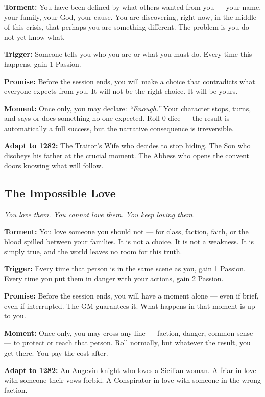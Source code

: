 \textbf{Torment:} You have been defined by what others wanted from you
--- your name, your family, your God, your cause. You are discovering,
right now, in the middle of this crisis, that perhaps you are something
different. The problem is you do not yet know what.

\textbf{Trigger:} Someone tells you who you are or what you must do.
Every time this happens, gain 1 Passion.

\textbf{Promise:} Before the session ends, you will make a choice that
contradicts what everyone expects from you. It will not be the right
choice. It will be yours.

\textbf{Moment:} Once only, you may declare: \textit{``Enough.''} Your
character stops, turns, and says or does something no one expected.
Roll 0 dice --- the result is automatically a full success, but the
narrative consequence is irreversible.

\textbf{Adapt to 1282:} The Traitor's Wife who decides to stop hiding.
The Son who disobeys his father at the crucial moment. The Abbess who
opens the convent doors knowing what will follow.

\filetto

\subsection{The Impossible Love}
\textit{You love them. You cannot love them. You keep loving them.}

\textbf{Torment:} You love someone you should not --- for class, faction,
faith, or the blood spilled between your families. It is not a choice.
It is not a weakness. It is simply true, and the world leaves no room
for this truth.

\textbf{Trigger:} Every time that person is in the same scene as you,
gain 1 Passion. Every time you put them in danger with your actions,
gain 2 Passion.

\textbf{Promise:} Before the session ends, you will have a moment alone
--- even if brief, even if interrupted. The GM guarantees it. What
happens in that moment is up to you.

\textbf{Moment:} Once only, you may cross any line --- faction, danger,
common sense --- to protect or reach that person. Roll normally, but
whatever the result, you get there. You pay the cost after.

\textbf{Adapt to 1282:} An Angevin knight who loves a Sicilian woman.
A friar in love with someone their vows forbid. A Conspirator in love
with someone in the wrong faction.

